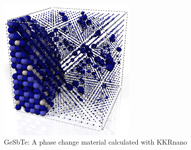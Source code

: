 \begin{figure}[h!]
\begin{center}
  \includegraphics[width=0.6\textwidth]{NatConference.png}
  \caption{GeSbTe: A phase change material calculated with KKRnano}
\end{center}
\end{figure}

